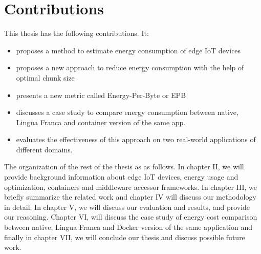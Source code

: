 \section{Contributions}
This thesis has the following contributions. It: 
\begin{itemize}
    \item proposes a method to estimate energy consumption of edge IoT devices 
    \item proposes a new approach to reduce energy consumption with the help of optimal chunk size
    \item presents a new metric called Energy-Per-Byte or EPB
    \item discusses a case study to compare energy consumption between native, Lingua Franca 
    and container version of the same app.
    \item evaluates the effectiveness of this approach on two real-world applications of different domains.
\end{itemize}

The organization of the rest of the thesis as as follows. In chapter II, we will provide 
background information about edge IoT devices, energy usage and optimization, containers and middleware 
accessor frameworks. In chapter III, we briefly summarize the related work and chapter IV will discuss 
our methodology in detail. In chapter V, we will discuss our evaluation and results, and provide 
our reasoning. Chapter VI, will discuss the case study of energy cost comparison between native, 
Lingua Franca and Docker version of the same application and finally in chapter VII, we will conclude 
our thesis and discuss possible future work.
